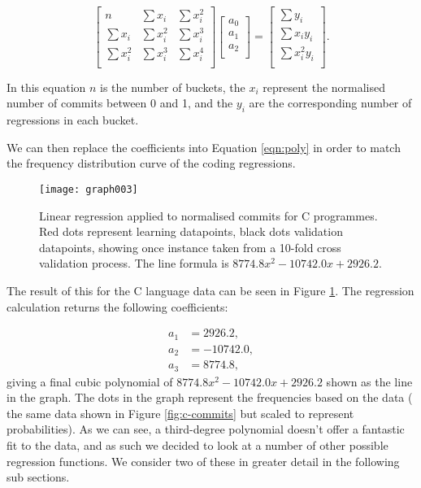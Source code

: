 \documentclass[10pt,journal,compsoc]{IEEEtran}
\begin{document}
\begin{equation}
\begin{bmatrix}
n          & \sum x_i   & \sum x_i^2 \\
\sum x_i   & \sum x_i^2 & \sum x_i^3 \\
\sum x_i^2 & \sum x_i^3 & \sum x_i^4 \\
\end{bmatrix}
\begin{bmatrix}
a_0 \\
a_1 \\
a_2 \\
\end{bmatrix}
=
\begin{bmatrix}
\sum y_i \phantom{x_i} \\
\sum x_i y_i           \\
\sum x_i^2 y_i         \\
\end{bmatrix}.
\end{equation}

In this equation $n$ is the number of buckets, the $x_i$ represent the normalised number of commits between 0 and 1, and the $y_i$ are the corresponding number of regressions in each bucket.

We can then replace the coefficients into Equation \ref{eqn:poly} in order to match the frequency distribution curve of the coding regressions.

\begin{figure}[t]
\centering
\texttt{[image: graph003]}%
\caption{\label{fig:c-linear}Linear regression applied to normalised commits for C programmes. Red dots represent learning datapoints, black dots validation datapoints, showing once instance taken from a 10-fold cross validation process. The line formula is $8774.8 x^{2} - 10742.0 x + 2926.2$.}
\end{figure}

The result of this for the C language data can be seen in Figure \ref{fig:c-linear}. The regression calculation returns the following coefficients:

\begin{align*}
a_1 & = 2926.2, \\
a_2 & = -10742.0, \\
a_3 & = 8774.8,
\end{align*}
giving a final cubic polynomial of $8774.8 x^{2} - 10742.0 x + 2926.2$ shown as the line in the graph. The dots in the graph represent the frequencies based on the data (\ie\/ the same data shown in Figure \ref{fig:c-commits} but scaled to represent probabilities). As we can see, a third-degree polynomial doesn't offer a fantastic fit to the data, and as such we decided to look at a number of other possible regression functions. We consider two of these in greater detail in the following sub sections.
\end{document}
